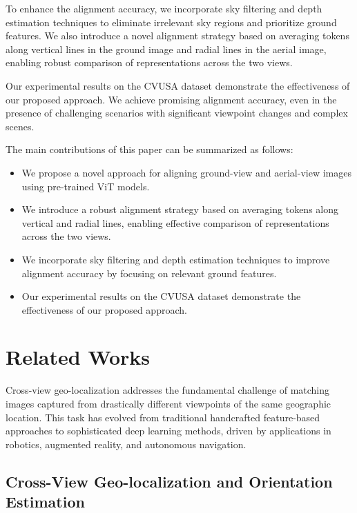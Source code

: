 \documentclass{bmvc2k}
\begin{document}
To enhance the alignment accuracy, we incorporate sky filtering and depth estimation techniques to eliminate irrelevant sky regions and prioritize ground features. We also introduce a novel alignment strategy based on averaging tokens along vertical lines in the ground image and radial lines in the aerial image, enabling robust comparison of representations across the two views. 

Our experimental results on the CVUSA dataset demonstrate the effectiveness of our proposed approach. We achieve promising alignment accuracy, even in the presence of challenging scenarios with significant viewpoint changes and complex scenes. 

The main contributions of this paper can be summarized as follows:

\begin{itemize}
    \item We propose a novel approach for aligning ground-view and aerial-view images using pre-trained ViT models.
    \item We introduce a robust alignment strategy based on averaging tokens along vertical and radial lines, enabling effective comparison of representations across the two views.
    \item We incorporate sky filtering and depth estimation techniques to improve alignment accuracy by focusing on relevant ground features.
    \item Our experimental results on the CVUSA dataset demonstrate the effectiveness of our proposed approach.
\end{itemize}

\section{Related Works}
\label{sec:related_works}

Cross-view geo-localization addresses the fundamental challenge of matching images captured from drastically different viewpoints of the same geographic location. This task has evolved from traditional handcrafted feature-based approaches to sophisticated deep learning methods, driven by applications in robotics, augmented reality, and autonomous navigation.

\subsection{Cross-View Geo-localization and Orientation Estimation}
\end{document}
